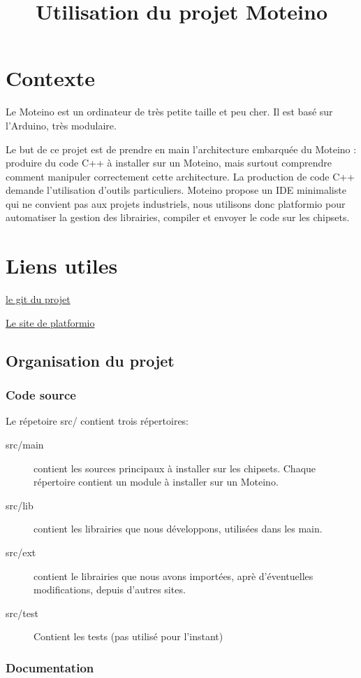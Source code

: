 \documentclass{report}
\title{Utilisation du projet Moteino}
\begin{document}
\chapter{Contexte}

Le Moteino est un ordinateur de très petite taille et peu cher. Il est basé sur l'Arduino, très modulaire. 

Le but de ce projet est de prendre en main l'architecture embarquée du Moteino : produire du code C++ à installer sur un Moteino, mais surtout comprendre comment manipuler correctement cette architecture.
La production de code C++ demande l'utilisation d'outils particuliers. Moteino propose un IDE minimaliste qui ne convient pas aux projets industriels, nous utilisons donc platformio pour automatiser la gestion des librairies, compiler et envoyer le code sur les chipsets.

\chapter{Liens utiles}

\href{https://github.com/glelouet/Moteino}{le git du projet}

\href{http://platformio.org/}{Le site de platformio}

\section{Organisation du projet}

\subsection{Code source}

Le répetoire src/ contient trois répertoires:
\begin{description}
\item[src/main] contient les sources principaux à installer sur les chipsets. Chaque répertoire contient un module à installer sur un Moteino.
\item[src/lib] contient les librairies que nous développons, utilisées dans les main.
\item[src/ext] contient le librairies que nous avons importées, aprè d'éventuelles modifications, depuis d'autres sites.
\item[src/test] Contient les tests (pas utilisé pour l'instant)
\end{description}

\subsection{Documentation}
\end{document}
